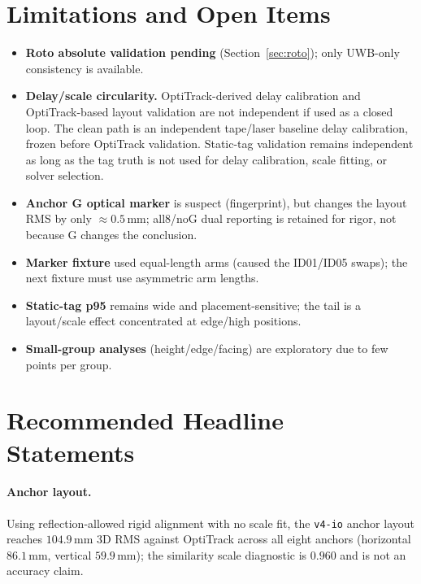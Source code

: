 \documentclass[11pt,a4paper]{article}
\newcommand{\mm}{\,\si{\milli\meter}}
\begin{document}
\section{Limitations and Open Items}
\label{sec:limits}

\begin{itemize}[leftmargin=1.4em]
  \item \textbf{Roto absolute validation pending} (Section~\ref{sec:roto}); only UWB-only
        consistency is available.
  \item \textbf{Delay/scale circularity.} OptiTrack-derived delay calibration and
        OptiTrack-based layout validation are not independent if used as a closed loop. The
        clean path is an independent tape/laser baseline delay calibration, frozen before
        OptiTrack validation. Static-tag validation remains independent as long as the tag
        truth is not used for delay calibration, scale fitting, or solver selection.
  \item \textbf{Anchor G optical marker} is suspect (fingerprint), but changes the layout RMS
        by only $\approx\!0.5\mm$; all8/noG dual reporting is retained for rigor, not because
        G changes the conclusion.
  \item \textbf{Marker fixture} used equal-length arms (caused the ID01/ID05 swaps); the
        next fixture must use asymmetric arm lengths.
  \item \textbf{Static-tag p95} remains wide and placement-sensitive; the tail is a
        layout/scale effect concentrated at edge/high positions.
  \item \textbf{Small-group analyses} (height/edge/facing) are exploratory due to few points
        per group.
\end{itemize}

\section{Recommended Headline Statements}
\label{sec:headline}

\paragraph{Anchor layout.}
Using reflection-allowed rigid alignment with no scale fit, the \texttt{v4-io} anchor layout
reaches $104.9\mm$ 3D RMS against OptiTrack across all eight anchors (horizontal $86.1\mm$,
vertical $59.9\mm$); the similarity scale diagnostic is $0.960$ and is not an accuracy claim.
\end{document}
